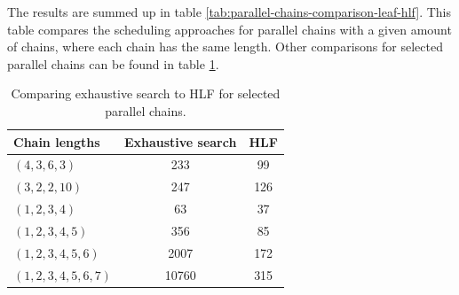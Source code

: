 The results are summed up in table \ref{tab:parallel-chains-comparison-leaf-hlf}. This table compares the scheduling approaches for parallel chains with a given amount of chains, where each chain has the same length. Other comparisons for selected parallel chains can be found in table \ref{tab:selected-parallel-chains-comparison}.

\begin{table}[ht]
  \centering
  \quad
  \caption{Parallel chains: Comparison of the number of snapshots needed by exhaustive search in contrast to HLF. Each table denotes the number of chains ($N$) to the right, and the length of each chain ($L$) downwards (the corresponding parallel chains then have the chain length sequence $\chainlengths{L_1,L_2,\dots,L_n}$, where $L_1=L_2=\dots=L_n=L$).}
  \label{tab:parallel-chains-comparison-leaf-hlf}
\end{table}

\begin{table}[ht]
  \centering
  \begin{tabular}[ht]{lcc}
    Chain lengths & Exhaustive search & HLF \\
    \hline
    $(4,3,6,3)$ & 233 & 99 \\
    $(3,2,2,10)$ & 247 & 126 \\
    $(1,2,3,4)$ & 63 & 37 \\
    $(1,2,3,4,5)$ & 356 & 85 \\
    $(1,2,3,4,5,6)$ & 2007 & 172 \\
    $(1,2,3,4,5,6,7)$ & 10760 & 315
  \end{tabular}
  \caption{Comparing exhaustive search to HLF for selected parallel chains.}
  \label{tab:selected-parallel-chains-comparison}
\end{table}

